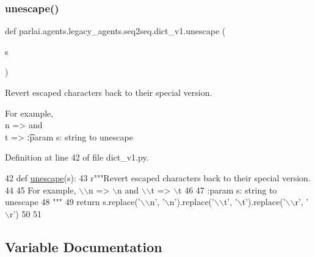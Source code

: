 \subsubsection{\texorpdfstring{unescape()}{unescape()}}
{\footnotesize\ttfamily def parlai.\+agents.\+legacy\+\_\+agents.\+seq2seq.\+dict\+\_\+v1.\+unescape (\begin{DoxyParamCaption}\item[{}]{s }\end{DoxyParamCaption})}

\begin{DoxyVerb}Revert escaped characters back to their special version.

For example, \\n => \n and \\t => \t

:param s: string to unescape
\end{DoxyVerb}
 

Definition at line 42 of file dict\+\_\+v1.\+py.


\begin{DoxyCode}
42 \textcolor{keyword}{def }\hyperlink{namespaceparlai_1_1agents_1_1legacy__agents_1_1seq2seq_1_1dict__v1_affad139ddec76996dc9a93f6123d545e}{unescape}(s):
43     \textcolor{stringliteral}{r"""Revert escaped characters back to their special version.}
44 \textcolor{stringliteral}{}
45 \textcolor{stringliteral}{    For example, \(\backslash\)\(\backslash\)n => \(\backslash\)n and \(\backslash\)\(\backslash\)t => \(\backslash\)t}
46 \textcolor{stringliteral}{}
47 \textcolor{stringliteral}{    :param s: string to unescape}
48 \textcolor{stringliteral}{    """}
49     \textcolor{keywordflow}{return} s.replace(\textcolor{stringliteral}{'\(\backslash\)\(\backslash\)n'}, \textcolor{stringliteral}{'\(\backslash\)n'}).replace(\textcolor{stringliteral}{'\(\backslash\)\(\backslash\)t'}, \textcolor{stringliteral}{'\(\backslash\)t'}).replace(\textcolor{stringliteral}{'\(\backslash\)\(\backslash\)r', '}\(\backslash\)r')
50 
51 
\end{DoxyCode}


\subsection{Variable Documentation}
\mbox{\label{namespaceparlai_1_1agents_1_1legacy__agents_1_1seq2seq_1_1dict__v1_abbbcb24730358ec013ea65e5e562ec97}} 
